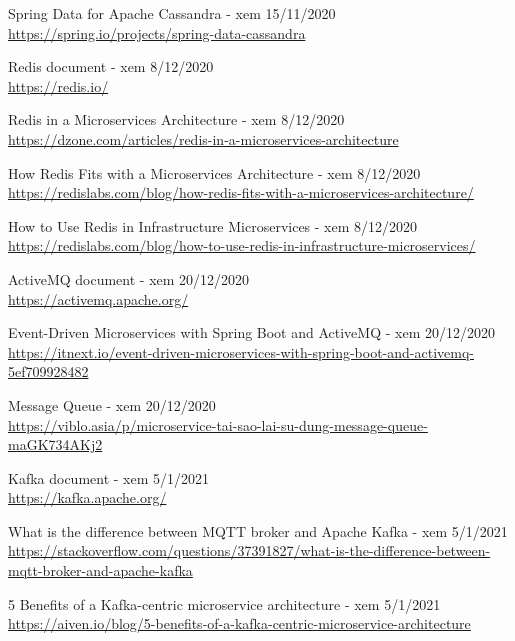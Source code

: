 \documentclass[12pt,a4paper,oneside]{book}
\begin{document}
\begin{thebibliography}{80}
        \bibitem{} Spring Data for Apache Cassandra - xem 15/11/2020\\
        \url{https://spring.io/projects/spring-data-cassandra}
        
        \bibitem{} Redis document - xem 8/12/2020\\
        \url{https://redis.io/}
        
        \bibitem{} Redis in a Microservices Architecture - xem 8/12/2020\\
        \url{https://dzone.com/articles/redis-in-a-microservices-architecture}
        
        \bibitem{} How Redis Fits with a Microservices Architecture - xem 8/12/2020\\
        \url{https://redislabs.com/blog/how-redis-fits-with-a-microservices-architecture/}
        
        \bibitem{} How to Use Redis in Infrastructure Microservices - xem 8/12/2020\\
        \url{https://redislabs.com/blog/how-to-use-redis-in-infrastructure-microservices/}
        
        \bibitem{} ActiveMQ document - xem 20/12/2020\\
        \url{https://activemq.apache.org/}
        
        \bibitem{} Event-Driven Microservices with Spring Boot and ActiveMQ - xem 20/12/2020\\
        \url{https://itnext.io/event-driven-microservices-with-spring-boot-and-activemq-5ef709928482}
		
        \bibitem{} Message Queue - xem 20/12/2020\\
        \url{https://viblo.asia/p/microservice-tai-sao-lai-su-dung-message-queue-maGK734AKj2}
        
        \bibitem{} Kafka document - xem 5/1/2021\\
        \url{https://kafka.apache.org/}
        
        \bibitem{} What is the difference between MQTT broker and Apache Kafka - xem 5/1/2021\\
        \url{https://stackoverflow.com/questions/37391827/what-is-the-difference-between-mqtt-broker-and-apache-kafka}
        
        \bibitem{} 5 Benefits of a Kafka-centric microservice architecture - xem 5/1/2021\\
        \url{https://aiven.io/blog/5-benefits-of-a-kafka-centric-microservice-architecture}
        

\end{thebibliography}
\end{document}
